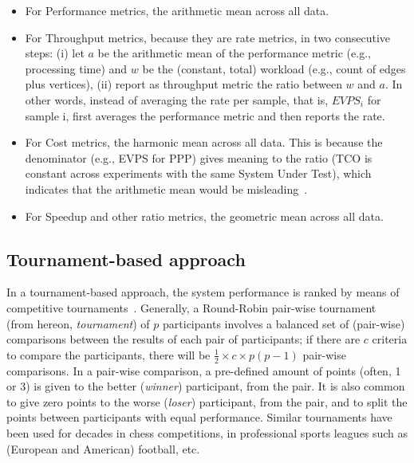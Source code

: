 \begin{itemize}
	\item For Performance metrics, the arithmetic mean across all data.
	\item For Throughput metrics, because they are rate metrics, in two consecutive steps: (i) let $a$ be the arithmetic mean of the performance metric (e.g., processing time) and $w$ be the (constant, total) workload (e.g., count of edges plus vertices), (ii) report as throughput metric the ratio between $w$ and $a$. In other words, instead of averaging the rate per sample, that is, $EVPS_i$ for sample i, \toolname{} first averages the performance metric and then reports the rate.
	\item For Cost metrics, the harmonic mean across all data. This is because the denominator (e.g., EVPS for PPP) gives meaning to the ratio (TCO is constant across experiments with the same System Under Test), which indicates that the arithmetic mean would be misleading~\cite[S.3.1.1]{DBLP:conf/sc/HoeflerB15}.
	\item For Speedup and other ratio metrics, the geometric mean across all data.
\end{itemize}








\subsection{Tournament-based approach} \label{sec:competitions:tournament}
In a tournament-based approach, the system performance is ranked by means of competitive tournaments~\cite{Thurstone1927}.  Generally, a Round-Robin pair-wise tournament~\cite{David1960} (from hereon, {\it tournament}) of $p$ participants involves a balanced set of (pair-wise) comparisons between the results of each pair of participants; if there are $c$ criteria to compare the participants, there will be $\frac{1}{2} \times c \times p (p - 1)$ pair-wise comparisons. In a pair-wise comparison, a pre-defined amount of points (often, 1 or 3) is given to the better ({\it winner}) participant, from the pair. It is also common to give zero points to the worse ({\it loser}) participant, from the pair, and to split the points between participants with equal performance. Similar tournaments have been used for decades in chess competitions, in professional sports leagues such as (European and American) football, etc.

